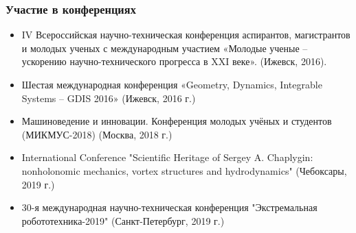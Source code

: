 %
%

\begin{frame}
\frametitle{Участие в конференциях}
\begin{itemize}
	\item IV Всероссийская научно-техническая конференция аспирантов, магистрантов и молодых ученых с международным участием «Молодые ученые -- ускорению научно-технического прогресса в XXI веке». (Ижевск, 2016).
	\item Шестая международная конференция «Geometry, Dynamics, Integrable Systems -- GDIS 2016» (Ижевск, 2016 г.)
	\item Машиноведение и инновации. Конференция молодых учёных и студентов (МИКМУС-2018) (Москва, 2018 г.)
	\item International Conference "Scientific Heritage of Sergey A. Chaplygin: nonholonomic mechanics, vortex structures and hydrodynamics" (Чебоксары, 2019 г.)
	\item 30-я международная научно-техническая конференция "Экстремальная робототехника-2019" (Санкт-Петербург, 2019 г.)	
\end{itemize}
\end{frame}

